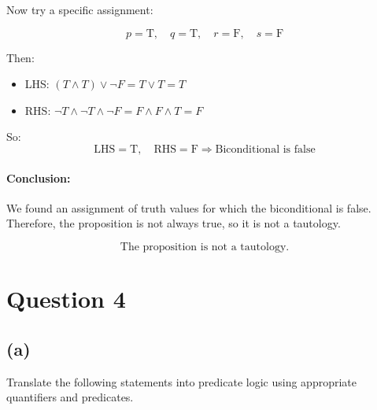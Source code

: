 \documentclass{article}
\begin{document}
Now try a specific assignment:

\[
p = \text{T},\quad q = \text{T},\quad r = \text{F},\quad s = \text{F}
\]

Then:

\begin{itemize}
  \item LHS: \( (T \land T) \lor \neg F = T \lor T = T \)
  \item RHS: \( \neg T \land \neg T \land \neg F = F \land F \land T = F \)
\end{itemize}

So:
\[
\text{LHS} = \text{T},\quad \text{RHS} = \text{F} \Rightarrow \text{Biconditional is false}
\]

\paragraph{Conclusion:}

We found an assignment of truth values for which the biconditional is false.  
Therefore, the proposition is not always true, so it is not a tautology.

\[
\boxed{\text{The proposition is not a tautology.}}
\]

\section*{Question 4}

\subsection*{(a)}

Translate the following statements into predicate logic using appropriate quantifiers and predicates.
\end{document}
